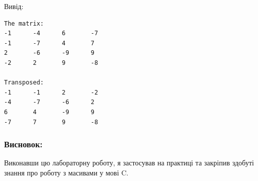 \documentclass[14pt]{extreport}
\begin{document}
Вивід:
\begin{lstlisting}
The matrix:
-1      -4      6       -7
-1      -7      4       7
2       -6      -9      9
-2      2       9       -8

Transposed:
-1      -1      2       -2
-4      -7      -6      2
6       4       -9      9
-7      7       9       -8
\end{lstlisting}

\subsubsection*{Висновок:}

Виконавши цю лабораторну роботу, я
застосував на практиці та закріпив
здобуті знання про роботу
з масивами у мові C.
\end{document}
